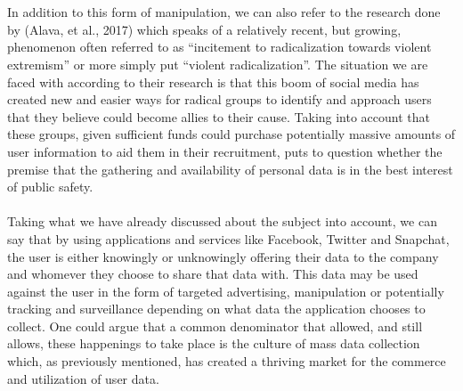 \documentclass[11pt]{article}
\begin{document}
\\ \\
In addition to this form of manipulation, we can also refer to the research done by (Alava, et al., 2017) which speaks of a relatively recent, but growing, phenomenon often referred to as “incitement to radicalization towards violent extremism” or more simply put “violent radicalization”. The situation we are faced with according to their research is that this boom of social media has created new and easier ways for radical groups to identify and approach users that they believe could become allies to their cause. Taking into account that these groups, given sufficient funds could purchase potentially massive amounts of user information to aid them in their recruitment, puts to question whether the premise that the gathering and availability of personal data is in the best interest of public safety. 
\\ \\
Taking what we have already discussed about the subject into account, we can say that by using applications and services like Facebook, Twitter and Snapchat, the user is either knowingly or unknowingly offering their data to the company and whomever they choose to share that data with. This data may be used against the user in the form of targeted advertising, manipulation or potentially tracking and surveillance depending on what data the application chooses to collect. One could argue that a common denominator that allowed, and still allows, these happenings to take place is the culture of mass data collection which, as previously mentioned, has created a thriving market for the commerce and utilization of user data.  
\\
\end{document}
